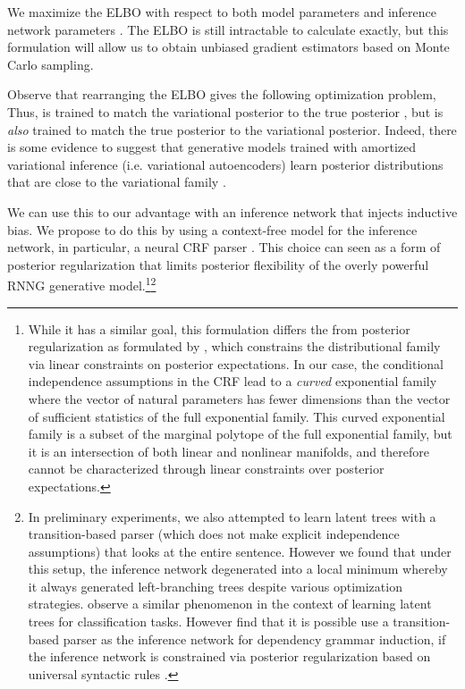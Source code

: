 \documentclass[11pt,a4paper]{article}
\begin{document}
We maximize the ELBO with respect to both model parameters  and inference network parameters .  The
ELBO is still intractable to calculate exactly, but this formulation
will allow us to obtain unbiased gradient estimators based on Monte
Carlo sampling.

Observe that rearranging the ELBO gives the following optimization problem,
\vspace{-1.5mm}
 Thus,  is trained to match the variational posterior  to the true posterior , but  is \emph{also} trained to match the true posterior to the variational posterior. Indeed, there is some evidence to suggest that generative models trained with amortized variational inference (i.e. variational autoencoders) learn posterior distributions that are close to the variational family \cite{Cremer2018}.

We can use this to our advantage with an inference network that
injects inductive bias.  We propose to do this by using a context-free
model for the inference network, in particular, a neural CRF parser
\cite{durrett2015crf}. This choice can seen as a form of
posterior regularization that limits posterior flexibility of the overly powerful  RNNG generative model.\footnote{While it has a similar goal, 
  this formulation differs the from posterior
  regularization as formulated by \citet{ganchev2010post}, which constrains
  the distributional family via linear constraints on
  posterior expectations. In our case, the conditional independence assumptions
  in the CRF lead to a \emph{curved} exponential family where the vector of natural parameters 
  has fewer dimensions than the vector of  sufficient statistics of
  the full exponential family. This curved exponential family is 
  a subset of the marginal polytope of the full exponential family, but
  it is an intersection of both linear and nonlinear manifolds, and
  therefore cannot be characterized through linear
  constraints over posterior expectations.}\footnote{In preliminary experiments, we also
  attempted to learn latent trees with a transition-based parser
  (which does not make explicit independence assumptions) that looks
  at the entire sentence. However we found that under this setup, the
  inference network degenerated into a local minimum whereby it always
  generated left-branching trees despite various optimization
  strategies. \citet{williams2018latent} observe a similar phenomenon
  in the context of learning latent trees for classification
  tasks. However \citet{li2019grammar} find that it is possible use a
  transition-based parser as the inference network for dependency
  grammar induction, if the inference network is constrained via
  posterior regularization \cite{ganchev2010post} based on universal
  syntactic rules \cite{naseem2010univ}.}
\end{document}
